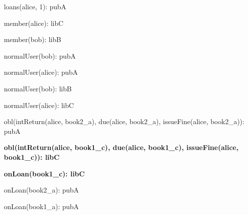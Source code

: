 \documentclass{article}
\begin{document}
{\begin{minipage}{\tableWidth}
\begin{description}[align=left,leftmargin=1em,noitemsep,labelsep=\parindent]
\item{{loans(\allowbreak{}alice, 1): pubA}}
\item{{member(\allowbreak{}alice): libC}}
\item{{member(\allowbreak{}bob): libB}}
\item{{normalUser(\allowbreak{}bob): pubA}}
\item{{normalUser(\allowbreak{}alice): pubA}}
\item{{normalUser(\allowbreak{}bob): libB}}
\item{{normalUser(\allowbreak{}alice): libC}}
\item{{obl(\allowbreak{}intReturn(\allowbreak{}alice, book2\_a), due(\allowbreak{}alice, book2\_a), issueFine(\allowbreak{}alice, book2\_a)): pubA}}
\item\textbf{{obl(\allowbreak{}intReturn(\allowbreak{}alice, book1\_c), due(\allowbreak{}alice, book1\_c), issueFine(\allowbreak{}alice, book1\_c)): libC}}
\item\textbf{{onLoan(\allowbreak{}book1\_c): libC}}
\item{{onLoan(\allowbreak{}book2\_a): pubA}}
\item{{onLoan(\allowbreak{}book1\_a): pubA}}
\end{description}\end{minipage}}
\end{document}
